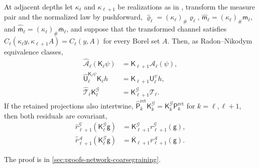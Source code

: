At adjacent depths let $\kappa_\ell$ and $\kappa_{\ell+1}$ be realizations as in
, transform the measure pair and the
normalized law by pushforward, $\widehat\varrho_\ell=(\kappa_\ell)_\#\varrho_\ell$,
$\widehat{\mathsf m}_\ell=(\kappa_\ell)_\#\mathsf m_\ell$, and
$\widehat{\bar{\mathsf m}}_\ell=(\kappa_\ell)_\#\bar{\mathsf m}_\ell$, and suppose
that the transformed channel satisfies $\widehat C_\ell(\kappa_\ell
y,\kappa_{\ell+1}A)=C_\ell(y,A)$ for every Borel set $A$. Then, as
Radon--Nikodym equivalence classes,
\begin{align}
\widehat{\mathcal A}_\ell(\mathsf K_\ell\psi)&=\mathsf K_{\ell+1}\mathcal A_\ell(\psi),
\label{eq:rg-action-rn-gauge-covariance}\\
\widehat{\mathsf U}_\ell^{\mathsf K_\ell\psi}\mathsf K_\ell h&=\mathsf K_{\ell+1}\mathsf U_\ell^\psi h,
\label{eq:rg-tilted-derivative-gauge-covariance}\\
\widehat{\mathcal T}_\ell\mathsf K^{\mathcal G}_\ell&=\mathsf K^{\mathcal G}_{\ell+1}\mathcal T_\ell .
\label{eq:rg-nonlinear-interaction-gauge-covariance}
\end{align}
If the retained projections also intertwine,
$\widehat{\mathsf P}^{\mathrm{ret}}_k\mathsf K^{\mathcal G}_k=\mathsf K^{\mathcal
G}_k\mathsf P^{\mathrm{ret}}_k$ for $k=\ell,\ell+1$, then both residuals are
covariant,
\begin{align}
\widehat r^{\mathcal G}_{\ell+1}(\mathsf K^{\mathcal G}_\ell\mathsf g)
&=\mathsf K^{\mathcal G}_{\ell+1}r^{\mathcal G}_{\ell+1}(\mathsf g),
\label{eq:rg-coordinate-residual-gauge-covariance}\\
\widehat{\overline r}{}^{\mathcal A}_{\ell+1}(\mathsf K^{\mathcal G}_\ell\mathsf g)
&=\overline{\mathsf K}_{\ell+1}\overline r^{\mathcal A}_{\ell+1}(\mathsf g).
\label{eq:rg-action-residual-gauge-covariance}
\end{align}

The proof is in \cref{sec:proofs-network-coarsegraining}.

